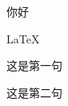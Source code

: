 \documentclass[fontset=windows, 12pt]{article}
\begin{document}
    你好

    \LaTeX


    这是第一句

    这是第二句

    
\end{document}
